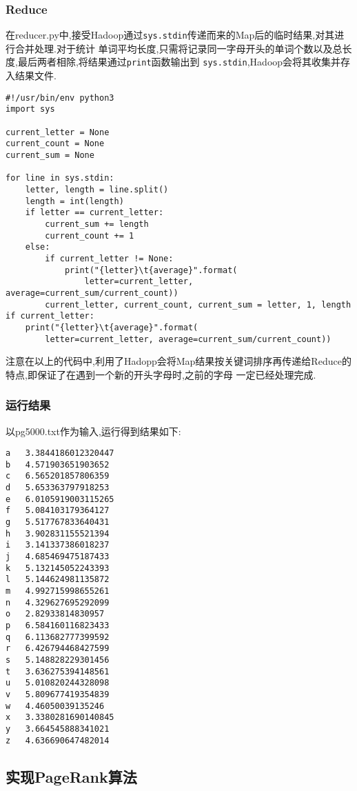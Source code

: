 \documentclass[a4paper]{article}
\begin{document}
        \subsubsection{Reduce}
在reducer.py中,接受Hadoop通过\texttt{sys.stdin}传递而来的Map后的临时结果,对其进行合并处理.对于统计
单词平均长度,只需将记录同一字母开头的单词个数以及总长度,最后两者相除,将结果通过\texttt{print}函数输出到
\texttt{sys.stdin},Hadoop会将其收集并存入结果文件.
\begin{verbatim}
#!/usr/bin/env python3
import sys

current_letter = None
current_count = None
current_sum = None

for line in sys.stdin:
    letter, length = line.split()
    length = int(length)
    if letter == current_letter:
        current_sum += length
        current_count += 1
    else:
        if current_letter != None:
            print("{letter}\t{average}".format(
                letter=current_letter, average=current_sum/current_count))
        current_letter, current_count, current_sum = letter, 1, length
if current_letter:
    print("{letter}\t{average}".format(
        letter=current_letter, average=current_sum/current_count))    
\end{verbatim}

注意在以上的代码中,利用了Hadopp会将Map结果按关键词排序再传递给Reduce的特点,即保证了在遇到一个新的开头字母时,之前的字母
一定已经处理完成.
            \subsubsection{运行结果}
以pg5000.txt作为输入,运行得到结果如下:
\begin{verbatim}
a   3.3844186012320447
b   4.571903651903652
c   6.565201857806359
d   5.653363797918253
e   6.0105919003115265
f   5.084103179364127
g   5.517767833640431
h   3.902831155521394
i   3.141337386018237
j   4.685469475187433
k   5.132145052243393
l   5.144624981135872
m   4.992715998655261
n   4.329627695292099
o   2.82933814830957
p   6.584160116823433
q   6.113682777399592
r   6.426794468427599
s   5.148828229301456
t   3.636275394148561
u   5.010820244328098
v   5.809677419354839
w   4.46050039135246
x   3.3380281690140845
y   3.664545888341021
z   4.636690647482014
\end{verbatim}
        \subsection{实现PageRank算法}
\end{document}
